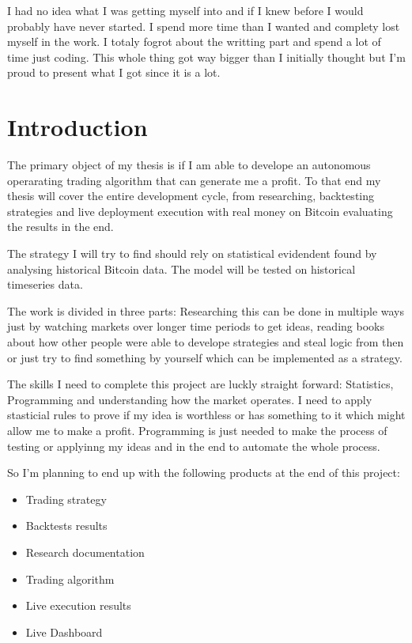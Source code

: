 \documentclass[12pt]{article}
\begin{document}
I had no idea what I was getting myself into and if I knew before I would probably have never started. I spend more time than I wanted and complety lost myself in the work. I totaly fogrot about the writting part and spend a lot of time just coding. This whole thing got way bigger than I initially thought but I'm proud to present what I got since it is a lot.





\newpage
\section{Introduction}
The primary object of my thesis is if I am able to develope an autonomous operarating trading algorithm that can generate me a profit. To that end my thesis will cover the entire development cycle, from researching, backtesting strategies and live deployment execution with real money on Bitcoin evaluating the results in the end.


The strategy I will try to find should rely on statistical evidendent found by analysing historical Bitcoin data. The model will be tested on historical timeseries data. 

The work is divided in three parts: Researching this can be done in multiple ways just by watching markets over longer time periods to get ideas, reading books about how other people were able to develope strategies and steal logic from then or just try to find something by yourself which can be implemented as a strategy.



The skills I need to complete this project are luckly straight forward: Statistics, Programming and understanding how the market operates. I need to apply stasticial rules to prove if my idea is worthless or has something to it which might allow me to make a profit. Programming is just needed to make the process of testing or applyinng my ideas and in the end to automate the whole process. 





So I'm planning to end up with the following products at the end of this project:

\begin{itemize}
    \item Trading strategy
    \item Backtests results
    \item Research documentation
    \item Trading algorithm
    \item Live execution results
    \item Live Dashboard

\end{itemize}
\end{document}
